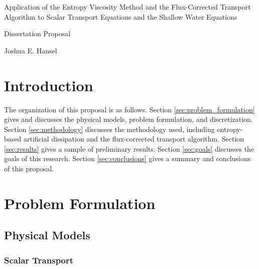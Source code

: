 \documentclass[12pt]{article}
\newcommand{\contentdir}{../dissertation/content}
\begin{document}
\begin{center}
  {\large
    Application of the Entropy Viscosity Method and the Flux-Corrected Transport
    Algorithm to Scalar Transport Equations and the Shallow Water Equations
  }

  {\scriptsize
    Dissertation Proposal
  }

  \vspace{1em}

  Joshua E. Hansel
\end{center}

\section{Introduction}


The organization of this proposal is as follows.
Section \ref{sec:problem_formulation} gives and discusses the physical models,
problem formulation, and discretization.
Section \ref{sec:methodology} discusses the methodology used, including
entropy-based artificial dissipation and the flux-corrected transport
algorithm.
Section \ref{sec:results} gives a sample of preliminary results.
Section \ref{sec:goals} discusses the goals of this research.
Section \ref{sec:conclusions} gives a summary and conclusions of this proposal.
\section{Problem Formulation\label{sec:problem_formulation}}
\subsection{Physical Models}
\subsubsection{Scalar Transport\label{sec:scalar_model}}

\end{document}
